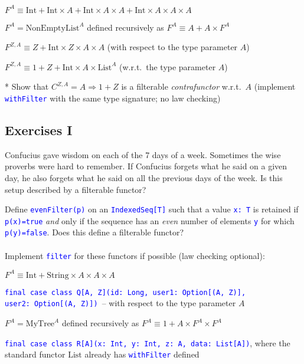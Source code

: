 $F^{A}\equiv\text{Int}+\text{Int}\times A+\text{Int}\times A\times A+\text{Int}\times A\times A\times A$

$F^{A}=\text{NonEmptyList}^{A}$ defined recursively as $F^{A}\equiv A+A\times F^{A}$ 

$F^{Z,A}\equiv Z+\text{Int}\times Z\times A\times A$ (with respect
to the type parameter $A$)

$F^{Z,A}\equiv1+Z+\text{Int}\times A\times\text{List}^{A}$ (w.r.t.\ the
type parameter $A$)

{*} Show that $C^{Z,A}=A\Rightarrow1+Z$ is a filterable \emph{contrafunctor}
w.r.t.\ $A$ (implement \texttt{\textcolor{blue}{\footnotesize{}withFilter}}
with the same type signature; no law checking)


\subsection{Exercises I}

Confucius gave wisdom on each of the 7 days of a week. Sometimes the
wise proverbs were hard to remember. If Confucius forgets what he
said on a given day, he also forgets what he said on all the previous
days of the week. Is this setup described by a filterable functor?

Define \texttt{\textcolor{blue}{\footnotesize{}evenFilter(p)}} on
an \texttt{\textcolor{blue}{\footnotesize{}IndexedSeq{[}T{]}}} such
that a value \texttt{\textcolor{blue}{\footnotesize{}x:\ T}} is retained
if \texttt{\textcolor{blue}{\footnotesize{}p(x)=true}} \emph{and}
only if the sequence has an \emph{even} number of elements \texttt{\textcolor{blue}{\footnotesize{}y}}
for which \texttt{\textcolor{blue}{\footnotesize{}p(y)=false}}. Does
this define a filterable functor?\\
\ \\
Implement \texttt{\textcolor{blue}{\footnotesize{}filter}} for these
functors if possible (law checking optional):

$F^{A}\equiv\text{Int}+\text{String}\times A\times A\times A$

\texttt{\textcolor{blue}{\footnotesize{}final case class Q{[}A, Z{]}(id:\ Long,
user1:\ Option{[}(A, Z){]}, user2:\ Option{[}(A, Z){]}) }}– with
respect to the type parameter $A$

$F^{A}=\text{MyTree}^{A}$ defined recursively as $F^{A}\equiv1+A\times F^{A}\times F^{A}$

\texttt{\textcolor{blue}{\footnotesize{}final case class R{[}A{]}(x:\ Int,\ y: Int,
z:\ A, data:\ List{[}A{]})}}, where the standard functor $\text{List}$
already has \texttt{\textcolor{blue}{\footnotesize{}withFilter}} defined

